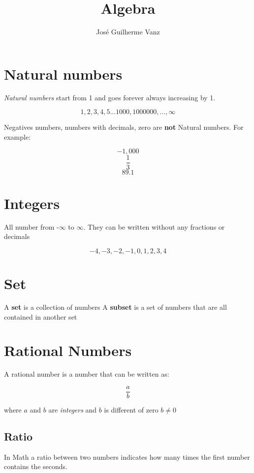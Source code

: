 \documentclass[]{article}
\title{Algebra}
\author{José Guilherme Vanz}
\begin{document}
\maketitle

\begin{abstract}

\end{abstract}

\section{Natural numbers}

\textit{Natural numbers} start from 1 and goes forever always increasing by 1.

\[ 1,2,3,4,5... 1000, 1000000, ..., \infty\]

Negatives numbers, numbers with decimals, zero are \textbf{not} Natural numbers. For example:

\[ -1,000 \]
\[\frac{1}{3}\]
\[ 89.1 \]

\section{Integers}

All number from -$ \infty $ to $ \infty $. They can be written without any fractions or decimals

\[-4, -3, -2, -1, 0, 1, 2, 3, 4\]

\section{Set}

A \textbf{set} is a collection of numbers
A \textbf{subset} is a set of numbers that are all contained in another set

\section{Rational Numbers}

A rational number is a number that can be written as:

\[ \frac{a}{b} \]

where $a$ and $b$ are \textit{integers} and $b$ is different of zero $ b \neq 0$

\subsection{Ratio}
In Math a ratio between two numbers indicates how many times the first number contains the seconds. 
\end{document}
